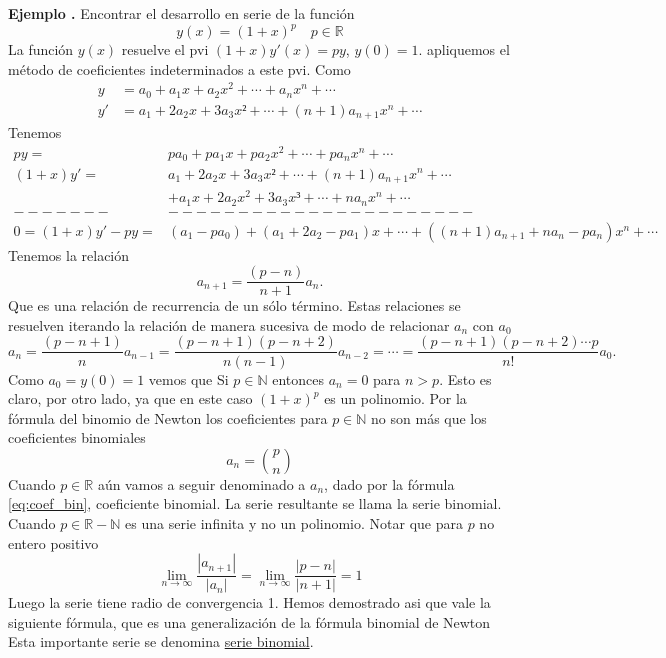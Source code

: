 \documentclass{article}
\newcommand{\rr}{\mathbb{R}}
\newcounter{ejemplo_cont}
\newenvironment{ejemplo}{\noindent\textbf{Ejemplo  \arabic{ejemplo_cont}.} }{\addtocounter{ejemplo_cont}{1}}
\begin{document}
\begin{ejemplo}  Encontrar el desarrollo en serie de la función
\[y(x)=(1+x)^p\quad p\in\rr\]
La función $y(x)$ resuelve el pvi  $(1+x)y'(x)=py$, $y(0)=1$. apliquemos el método de coeficientes indeterminados a este pvi.
Como
\[\begin{split}
   y&=a_0+a_1x+a_2x^2+\cdots+a_nx^n+\cdots\\
   y'&=a_1+2a_2x+3a_3x²+\cdots+(n+1)a_{n+1}x^n+\cdots
  \end{split}
\]
Tenemos
\[\begin{split}
   py=&pa_0+pa_1x+pa_2x^2+\cdots+pa_nx^n+\cdots\\
  (1+x)y'=&a_1+2a_2x+3a_3x²+\cdots+(n+1)a_{n+1}x^n+\cdots\\
          &+a_1x+2a_2x^2+3a_3x³+\cdots+na_{n}x^n+\cdots\\
-------&----------------------\\
0=(1+x)y'-py =& (a_1-pa_0)+(a_1+2a_2-pa_1)x+\cdots +((n+1)a_{n+1}+na_n-pa_n)x^n+\cdots
  \end{split}
\]
Tenemos la relación
\[ a_{n+1}=\frac{(p-n)}{n+1}a_n.
\]
Que es una relación de recurrencia de un sólo término. Estas relaciones se resuelven iterando la relación de manera sucesiva de modo de relacionar $a_n$ con $a_0$
\[a_n=\frac{(p-n+1)}{n}a_{n-1}=\frac{(p-n+1)(p-n+2)}{n(n-1)}a_{n-2}=\cdots=\frac{(p-n+1)(p-n+2)\cdots p}{n!}a_0.\]
Como $a_0=y(0)=1$ vemos que
Si $p\in\mathbb{N}$ entonces $a_n=0$ para $n>p$. Esto es claro, por otro lado, ya que en este caso $(1+x)^p$ es un polinomio. Por la fórmula del binomio de Newton los coeficientes para $p\in \mathbb{N}$  no son más que los coeficientes binomiales
\[a_n=\binom{p}{n}\]
 Cuando $p\in\mathbb{R}$ aún vamos a seguir denominado a $a_n$, dado por la fórmula \eqref{eq:coef_bin},   coeficiente binomial. La serie resultante se llama la serie binomial. Cuando $p\in\mathbb{R}-\mathbb{N}$ es una serie infinita y no  un polinomio. Notar que para $p$ no entero positivo
\[\lim\limits_{n\to\infty}\frac{|a_{n+1}|}{|a_n|}=\lim\limits_{n\to\infty}\frac{|p-n|}{|n+1|}=1\]
Luego la serie tiene radio de convergencia 1.  Hemos demostrado asi que vale la siguiente fórmula, que es una generalización de la fórmula binomial de Newton
Esta importante serie se denomina \href{http://en.wikipedia.org/wiki/Binomial_series}{serie binomial}.



\end{ejemplo}
\end{document}
